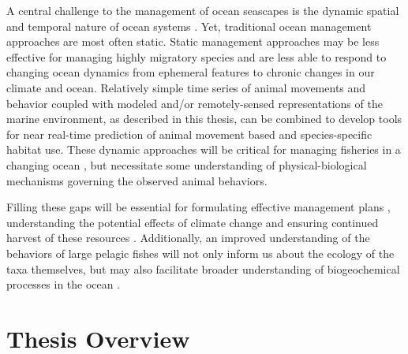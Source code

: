 A central challenge to the management of ocean seascapes is the dynamic spatial and temporal nature of ocean systems \citep{Lewison2015}. Yet, traditional ocean management approaches are most often static. Static management approaches may be less effective for managing highly migratory species and are less able to respond to changing ocean dynamics from ephemeral features to chronic changes in our climate and ocean. Relatively simple time series of animal movements and behavior coupled with modeled and/or remotely-sensed representations of the marine environment, as described in this thesis, can be combined to develop tools for near real-time prediction of animal movement based and species-specific habitat use. These dynamic approaches will be critical for managing fisheries in a changing ocean \citep{Maxwell2015}, but necessitate some understanding of physical-biological mechanisms governing the observed animal behaviors.

Filling these gaps will be essential for formulating effective management plans \citep{Cullis-Suzuki2010}, understanding the potential effects of climate change \citep{Hazen2012} and ensuring continued harvest of these resources \citep{Pauly1998, Watson2013}. Additionally, an improved understanding of the behaviors of large pelagic fishes will not only inform us about the ecology of the taxa themselves, but may also facilitate broader understanding of biogeochemical processes in the ocean \citep{Lavery2010, Roman2010}.

\section{Thesis Overview}

